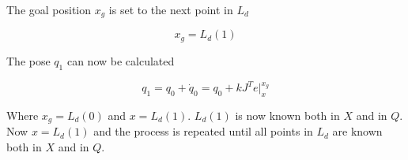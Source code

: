 The goal position $x_g$ is set to the next point in $L_d$

\begin{equation}
x_g = L_d(1)
\end{equation}

The pose $q_1$ can now be calculated

\begin{equation}
q_1 = q_0 + \dot{q}_0 = q_0 + kJ^Te|_{x}^{x_g}
\end{equation}

Where $x_g = L_d(0)$ and $x = L_d(1)$.  $L_d(1)$ is now known both in $X$ and in $Q$.  Now $x = L_d(1)$ and the process is repeated until all points in $L_d$ are known both in $X$ and in $Q$.






